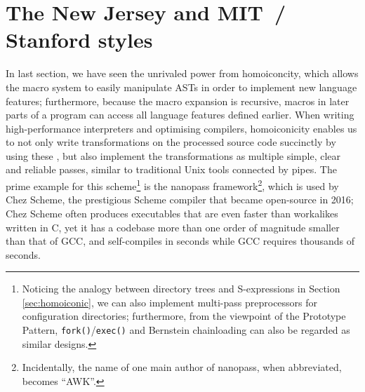 \section{The New Jersey and MIT~/ Stanford styles}\label{sec:wib}

In last section, we have seen the unrivaled power from homoiconcity, which
allows the macro system to easily manipulate ASTs in order to implement new
language features; furthermore, because the macro expansion is recursive,
macros in later parts of a program can access all language features defined
earlier.  When writing high-performance interpreters and optimising compilers,
homoiconicity enables us to not only write transformations on the processed
source code succinctly by using these , but also
implement the transformations as multiple simple, clear and reliable passes,
similar to traditional Unix tools connected by pipes.  The prime example for
this  scheme\footnote{\label{fn:slew}Noticing
the analogy between directory trees and S-expressions in Section~%
\ref{sec:homoiconic}, we can also implement multi-pass preprocessors for
configuration directories; furthermore, from the
viewpoint of the Prototype Pattern, \texttt{fork()}/\texttt{exec()} and
Bernstein chainloading can also be regarded as similar designs.} is the
nanopass framework\footnote{Incidentally, the
name of one main author of nanopass, when abbreviated, becomes ``AWK''.},
which is used by Chez Scheme, the prestigious Scheme
compiler that became open-source in 2016; Chez Scheme often produces
executables that are even faster than workalikes written in C, yet it
has a codebase more than one order of magnitude smaller than that of GCC,
and self-compiles in seconds while GCC requires thousands of seconds.

